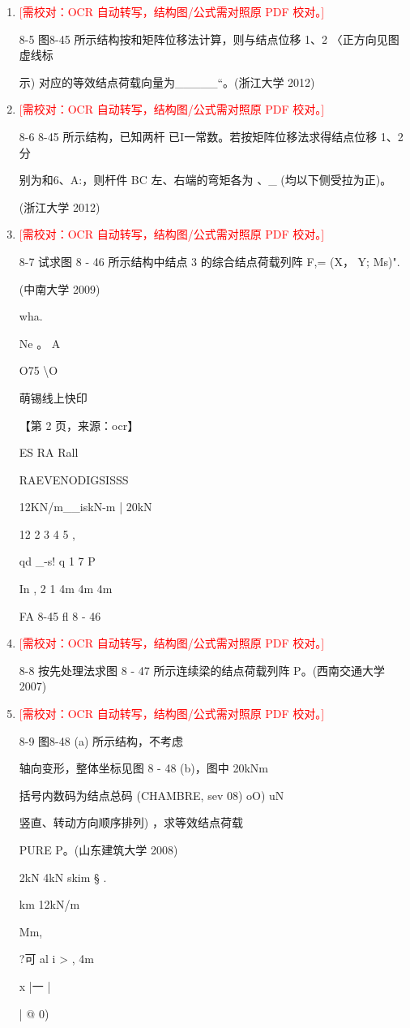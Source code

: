 \documentclass[UTF8,12pt,a4paper,openany]{ctexbook}
\newcommand{\TODO}[1]{\textcolor{red}{[需校对：#1]}}
\begin{document}
\begin{enumerate}[label=\textbf{\arabic*.},leftmargin=2em]
\item \TODO{OCR 自动转写，结构图/公式需对照原 PDF 校对。}\par 8-5 图8-45 所示结构按和矩阵位移法计算，则与结点位移 1、2 〈正方向见图虚线标\par 示) 对应的等效结点荷载向量为\_\_\_\_\_“。(浙江大学 2012)
\item \TODO{OCR 自动转写，结构图/公式需对照原 PDF 校对。}\par 8-6 8-45 所示结构，已知两杆 已I一常数。若按矩阵位移法求得结点位移 1、2 分\par 别为和6、A:，则杆件 BC 左、右端的弯矩各为 、\_ (均以下侧受拉为正)。\par (浙江大学 2012)
\item \TODO{OCR 自动转写，结构图/公式需对照原 PDF 校对。}\par 8-7 试求图 8 - 46 所示结构中结点 3 的综合结点荷载列阵 F,= (X， Y; Ms)".\par (中南大学 2009)\par wha.\par Ne 。  A\par O75 \textbackslash{}O\par 萌锡线上快印\par \par 【第 2 页，来源：ocr】\par ES RA Rall\par RAEVENODIGSISSS\par 12KN/m\_\_iskN-m | 20kN\par 12             2             3          4            5                   ,\par qd \_-s!       q       1                               7                        P\par In   , 2        1      4m     4m     4m\par FA 8-45    fl 8 - 46
\item \TODO{OCR 自动转写，结构图/公式需对照原 PDF 校对。}\par 8-8 按先处理法求图 8 - 47 所示连续梁的结点荷载列阵 P。(西南交通大学 2007)
\item \TODO{OCR 自动转写，结构图/公式需对照原 PDF 校对。}\par 8-9 图8-48 (a) 所示结构，不考虑\par 轴向变形，整体坐标见图 8 - 48 (b)，图中                         20kNm\par 括号内数码为结点总码 (CHAMBRE, sev 08) oO)          uN\par 竖直、转动方向顺序排列) ，求等效结点荷载\par PURE P。(山东建筑大学 2008)\par 2kN         4kN                           skim                         §                .\par km        12kN/m\par Mm,\par ?可      al           i           >  ,                       4m\par x             |一 |\par |                                 @                         0)

\end{enumerate}
\end{document}

